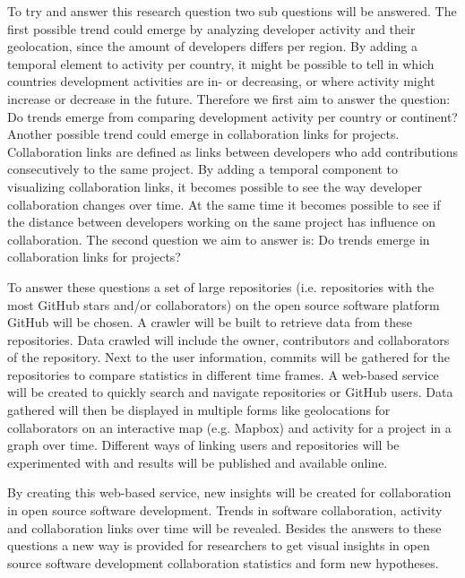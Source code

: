 \documentclass[acmtog, authorversion]{acmart}
\begin{document}
To try and answer this research question two sub questions will be answered. 
The first possible trend could emerge by analyzing developer activity and their geolocation, since the amount of developers differs per region.
By adding a temporal element to activity per country, it might be possible to tell in which countries development activities are in- or decreasing, or where activity might increase or decrease in the future.
Therefore we first aim to answer the question: Do trends emerge from comparing development activity per country or continent?
Another possible trend could emerge in collaboration links for projects.
Collaboration links are defined as links between developers who add contributions consecutively to the same project.
By adding a temporal component to visualizing collaboration links, it becomes possible to see the way developer collaboration changes over time.
At the same time it becomes possible to see if the distance between developers working on the same project has influence on collaboration.
The second question we aim to answer is: Do trends emerge in collaboration links for projects?

To answer these questions a set of large repositories (i.e. repositories with the most GitHub stars and/or collaborators) on the open source software platform GitHub will be chosen.
A crawler will be built to retrieve data from these repositories.
Data crawled will include the owner, contributors and collaborators of the repository.
Next to the user information, commits will be gathered for the repositories to compare statistics in different time frames.
A web-based service will be created to quickly search and navigate repositories or GitHub users.
Data gathered will then be displayed in multiple forms like geolocations for collaborators on an interactive map (e.g. Mapbox) and activity for a project in a graph over time.
Different ways of linking users and repositories will be experimented with and results will be published and available online.

By creating this web-based service, new insights will be created for collaboration in open source software development.
Trends in software collaboration, activity and collaboration links over time will be revealed.
Besides the answers to these questions a new way is provided for researchers to get visual insights in open source software development collaboration statistics and form new hypotheses.




\end{document}
